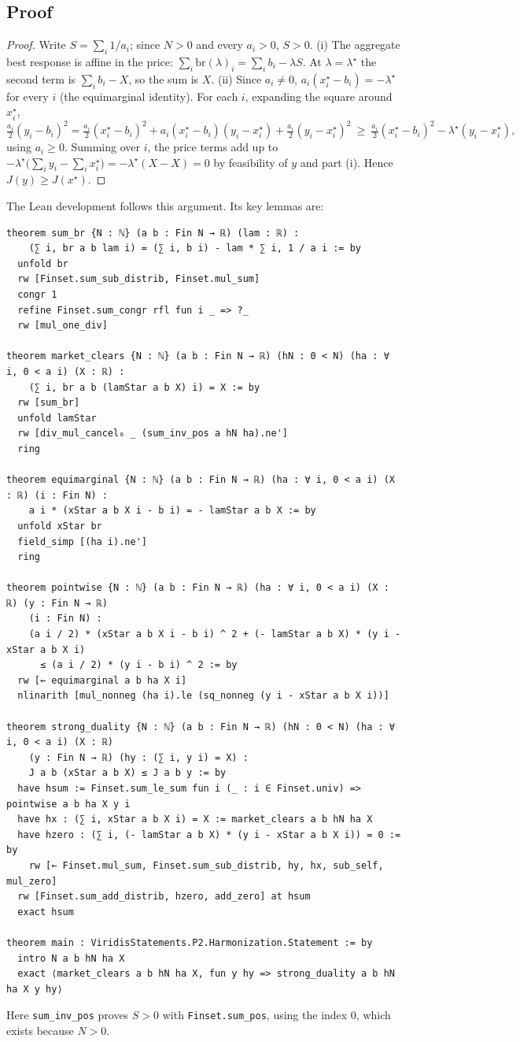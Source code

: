 \documentclass[11pt]{article}
\theoremstyle{definition}
\theoremstyle{remark}
\begin{document}
\subsection{Proof}
\begin{proof}
Write $S=\sum_i 1/a_i$; since $N>0$ and every $a_i>0$, $S>0$.
(i) The aggregate best response is affine in the price: $\sum_i\mathrm{br}(\lambda)_i=\sum_i b_i-\lambda S$.
At $\lambda=\lambda^\star$ the second term is $\sum_i b_i-X$, so the sum is $X$.
(ii) Since $a_i\ne0$, $a_i(x^\star_i-b_i)=-\lambda^\star$ for every $i$ (the equimarginal identity).
For each $i$, expanding the square around $x^\star_i$,
\[
\tfrac{a_i}{2}(y_i-b_i)^2=\tfrac{a_i}{2}(x^\star_i-b_i)^2+a_i(x^\star_i-b_i)(y_i-x^\star_i)+\tfrac{a_i}{2}(y_i-x^\star_i)^2
\ \ge\ \tfrac{a_i}{2}(x^\star_i-b_i)^2-\lambda^\star(y_i-x^\star_i),
\]
using $a_i\ge0$. Summing over $i$, the price terms add up to $-\lambda^\star\bigl(\sum_i y_i-\sum_i x^\star_i\bigr)=-\lambda^\star(X-X)=0$
by feasibility of $y$ and part (i). Hence $J(y)\ge J(x^\star)$.
\end{proof}
The Lean development follows this argument. Its key lemmas are:
\begin{lstlisting}
theorem sum_br {N : ℕ} (a b : Fin N → ℝ) (lam : ℝ) :
    (∑ i, br a b lam i) = (∑ i, b i) - lam * ∑ i, 1 / a i := by
  unfold br
  rw [Finset.sum_sub_distrib, Finset.mul_sum]
  congr 1
  refine Finset.sum_congr rfl fun i _ => ?_
  rw [mul_one_div]

theorem market_clears {N : ℕ} (a b : Fin N → ℝ) (hN : 0 < N) (ha : ∀ i, 0 < a i) (X : ℝ) :
    (∑ i, br a b (lamStar a b X) i) = X := by
  rw [sum_br]
  unfold lamStar
  rw [div_mul_cancel₀ _ (sum_inv_pos a hN ha).ne']
  ring

theorem equimarginal {N : ℕ} (a b : Fin N → ℝ) (ha : ∀ i, 0 < a i) (X : ℝ) (i : Fin N) :
    a i * (xStar a b X i - b i) = - lamStar a b X := by
  unfold xStar br
  field_simp [(ha i).ne']
  ring

theorem pointwise {N : ℕ} (a b : Fin N → ℝ) (ha : ∀ i, 0 < a i) (X : ℝ) (y : Fin N → ℝ)
    (i : Fin N) :
    (a i / 2) * (xStar a b X i - b i) ^ 2 + (- lamStar a b X) * (y i - xStar a b X i)
      ≤ (a i / 2) * (y i - b i) ^ 2 := by
  rw [← equimarginal a b ha X i]
  nlinarith [mul_nonneg (ha i).le (sq_nonneg (y i - xStar a b X i))]

theorem strong_duality {N : ℕ} (a b : Fin N → ℝ) (hN : 0 < N) (ha : ∀ i, 0 < a i) (X : ℝ)
    (y : Fin N → ℝ) (hy : (∑ i, y i) = X) :
    J a b (xStar a b X) ≤ J a b y := by
  have hsum := Finset.sum_le_sum fun i (_ : i ∈ Finset.univ) => pointwise a b ha X y i
  have hx : (∑ i, xStar a b X i) = X := market_clears a b hN ha X
  have hzero : (∑ i, (- lamStar a b X) * (y i - xStar a b X i)) = 0 := by
    rw [← Finset.mul_sum, Finset.sum_sub_distrib, hy, hx, sub_self, mul_zero]
  rw [Finset.sum_add_distrib, hzero, add_zero] at hsum
  exact hsum

theorem main : ViridisStatements.P2.Harmonization.Statement := by
  intro N a b hN ha X
  exact ⟨market_clears a b hN ha X, fun y hy => strong_duality a b hN ha X y hy⟩
\end{lstlisting}
Here \texttt{sum\_inv\_pos} proves $S>0$ with \texttt{Finset.sum\_pos}, using the index $0$, which exists because $N>0$.
\end{document}
